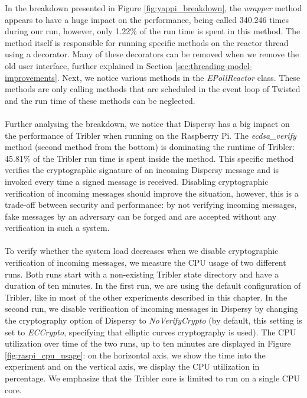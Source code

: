 \noindent In the breakdown presented in Figure \ref{fig:yappi_breakdown}, the \emph{wrapper} method appears to have a huge impact on the performance, being called 340.246 times during our run, however, only 1.22\% of the run time is spent in this method. The method itself is responsible for running specific methods on the reactor thread using a decorator. Many of these decorators can be removed when we remove the old user interface, further explained in Section \ref{sec:threading-model-improvements}. Next, we notice various methods in the \emph{EPollReactor} class. These methods are only calling methods that are scheduled in the event loop of Twisted and the run time of these methods can be neglected.\\\\
Further analysing the breakdown, we notice that Dispersy has a big impact on the performance of Tribler when running on the Raspberry Pi. The \emph{ecdsa\_verify} method (second method from the bottom) is dominating the runtime of Tribler: 45.81\% of the Tribler run time is spent inside the method. This specific method verifies the cryptographic signature of an incoming Dispersy message and is invoked every time a signed message is received. Disabling cryptographic verification of incoming messages should improve the situation, however, this is a trade-off between security and performance: by not verifying incoming messages, fake messages by an adversary can be forged and are accepted without any verification in such a system.\\\\
To verify whether the system load decreases when we disable cryptographic verification of incoming messages, we measure the CPU usage of two different runs. Both runs start with a non-existing Tribler state directory and have a duration of ten minutes. In the first run, we are using the default configuration of Tribler, like in most of the other experiments described in this chapter. In the second run, we disable verification of incoming messages in Dispersy by changing the cryptography option of Dispersy to \emph{NoVerifyCrypto} (by default, this setting is set to \emph{ECCrypto}, specifying that elliptic curves cryptography is used). The CPU utilization over time of the two runs, up to ten minutes are displayed in Figure \ref{fig:raspi_cpu_usage}: on the horizontal axis, we show the time into the experiment and on the vertical axis, we display the CPU utilization in percentage. We emphasize that the Tribler core is limited to run on a single CPU core.\\


